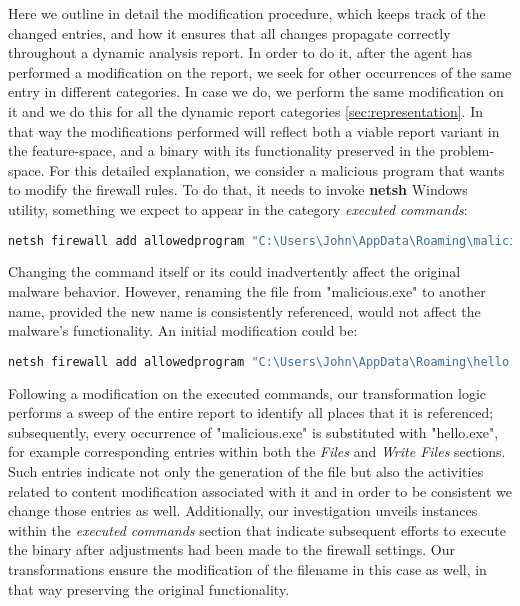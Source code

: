 Here we outline in detail the modification procedure, which keeps track of the changed entries, and how it ensures that all changes propagate correctly throughout a dynamic analysis report. In order to do it, after the agent has performed a modification on the report, we seek for other occurrences of the same entry in different categories. In case we do, we perform the same modification on it and we do this for all the dynamic report categories \autoref{sec:representation}. 
In that way the modifications performed will reflect both a viable report variant in the feature-space, and a binary with its functionality preserved in the problem-space.
For this detailed explanation, we consider a malicious program that wants to modify the firewall rules.
To do that, it needs to invoke \textbf{netsh} Windows utility, something we expect to appear in the category \textit{executed commands}: 

\begin{lstlisting}[language=bash]
netsh firewall add allowedprogram "C:\Users\John\AppData\Roaming\malicious.exe" "malicious.exe" ENABLE
\end{lstlisting}

Changing the command itself or its could inadvertently affect the original malware behavior. However, renaming the file from "malicious.exe" to another name, provided the new name is consistently referenced, would not affect the malware's functionality.
An initial modification could be:

\begin{lstlisting}[language=bash]
netsh firewall add allowedprogram "C:\Users\John\AppData\Roaming\hello.exe" "hello.exe" ENABLE
\end{lstlisting}

Following a modification on the executed commands, our transformation logic performs a sweep of the entire report to identify all places that it is referenced; subsequently, every occurrence of "malicious.exe" is substituted with "hello.exe", for example corresponding entries within both the \textit{Files} and \textit{Write Files} sections.
Such entries indicate not only the generation of the file but also the activities related to content modification associated with it and in order to be consistent we change those entries as well.
Additionally, our investigation unveils instances within the \textit{executed commands} section that indicate subsequent efforts to execute the binary after adjustments had been made to the firewall settings.
Our transformations ensure the modification of the filename in this case as well, in that way preserving the original functionality.

